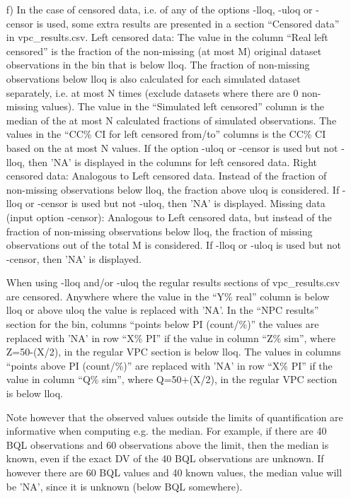 \begin{itemize}
	\item[f)] In the case of censored data, i.e. of any of the options -lloq, -uloq or -censor is used, some extra results are presented in a section “Censored data” in vpc\_results.csv. 
Left censored data: The value in the column “Real left censored” is the fraction of the non-missing (at most M) original dataset observations in the bin that is below lloq. The fraction of non-missing observations below lloq is also calculated for each simulated dataset separately, i.e. at most N times (exclude datasets where there are 0 non-missing values). The value in the “Simulated left censored” column is the median of the at most N calculated fractions of simulated observations. The values in the “CC\% CI for left censored from/to” columns is the CC\% CI based on the at most N values. If the option -uloq or -censor is used but not -lloq, then 'NA' is displayed in the columns for left censored data.
Right censored data: Analogous to Left censored data. Instead of the fraction of non-missing observations below lloq, the fraction above uloq is considered. If -lloq or -censor is used but not -uloq, then 'NA' is displayed.
Missing data (input option -censor): Analogous to Left censored data, but instead of the fraction of non-missing observations below lloq, the fraction of missing observations out of the total M is considered. If -lloq or -uloq is used but not -censor, then 'NA' is displayed.

When using -lloq and/or -uloq the 
regular results sections of vpc\_results.csv are censored.
Anywhere where the value in the “Y\% real” column is below lloq or above uloq the value is replaced with 'NA'. In the “NPC results” section for the bin, columns “points below PI (count/\%)” the values are replaced with 'NA' in row “X\% PI” if the value in column “Z\% sim”, where Z=50-(X/2), in the regular VPC section is below lloq. The values in columns “points above PI (count/\%)” are replaced with 'NA' in row “X\% PI” if the value in column “Q\% sim”, where Q=50+(X/2), in the regular VPC section is below lloq.

Note however that the observed values outside the
limits of quantification are informative when computing e.g. the median.
For example, if there are 40 BQL observations 
and 60 observations above the limit,
then the median is known, even if the exact DV of the
40 BQL observations are unknown. If however there are 60 BQL values and
40 known values, the median value will be 'NA',
since it is unknown (below BQL somewhere).


\end{itemize}
